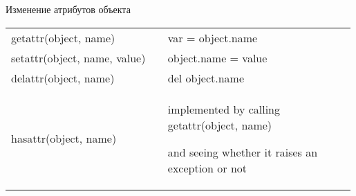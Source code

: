 \documentclass[hyperref={pdftex,unicode}]{beamer}
\begin{document}
\begin{frame}[fragile]{Изменение атрибутов объекта}
\begin{center}
  \begin{tabular}[h!]{p{0.45\linewidth} p{0.54\linewidth}}
    getattr(object, name) & var = object.name \\
    setattr(object, name, value) & object.name = value \\
    delattr(object, name) & del object.name \\
    hasattr(object, name) & \scriptsize{
      implemented by calling getattr(object, name)
      
      and seeing whether it raises an exception or not} \\
  \end{tabular}
\end{center}
\end{frame}
\end{document}
